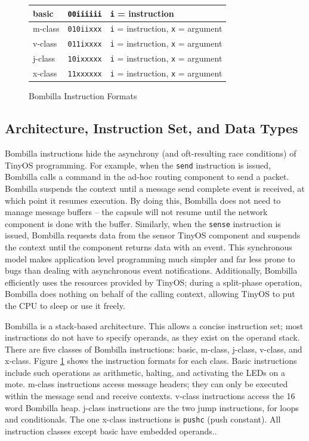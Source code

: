 \documentclass[10pt]{article}
\newcommand{\bomb}{Bombilla\xspace}
\begin{document}
\begin{figure}
\begin{center}
\def\W{3.25in}

\begin{tabular}{|l|l|l|}\hline
basic   &{\tt 00iiiiii} & {\tt i} = instruction\\ \hline
m-class &{\tt 010iixxx} & {\tt i} = instruction, {\tt x} = argument \\ \hline
v-class &{\tt 011ixxxx} & {\tt i} = instruction, {\tt x} = argument \\ \hline
j-class &{\tt 10ixxxxx} & {\tt i} = instruction, {\tt x} = argument \\ \hline
x-class &{\tt 11xxxxxx} & {\tt i} = instruction, {\tt x} = argument\\ \hline
\end{tabular}


\caption{\bomb Instruction Formats}

\label{fig:instr}
\end{center}
\end{figure}

\subsection{Architecture, Instruction Set, and Data Types}


\bomb instructions hide the asynchrony (and oft-resulting race
conditions) of TinyOS programming. For example, when the {\tt send}
instruction is issued, \bomb calls a command in the ad-hoc routing
component to send a packet. \bomb suspends the context until a
message send complete event is received, at which point it resumes
execution. By doing this, \bomb does not need to manage message
buffers -- the capsule will not resume until the network component is
done with the buffer. Similarly, when the {\tt sense} instruction is
issued, \bomb requests data from the sensor TinyOS component and
suspends the context until the component returns data with an
event. This synchronous model makes application level programming much
simpler and far less prone to bugs than dealing with asynchronous
event notifications. Additionally, \bomb efficiently uses the
resources provided by TinyOS; during a split-phase operation, \bomb
does nothing on behalf of the calling context, allowing TinyOS to put
the CPU to sleep or use it freely.


\bomb is a stack-based architecture. This allows a concise
instruction set; most instructions do not have to specify operands, as
they exist on the operand stack. There are five classes of \bomb
instructions: basic, m-class, j-class, v-class, and x-class. Figure
\ref{fig:instr} shows the instruction formats for each class. Basic
instructions include such operations as arithmetic, halting, and
activating the LEDs on a mote. m-class instructions access message
headers; they can only be executed within the message send and receive
contexts. v-class instructions access the 16 word \bomb
heap. j-class instructions are the two jump instructions, for loops
and conditionals. The one x-class instructions is {\tt pushc} (push
constant). All instruction classes except basic have embedded operands..
\end{document}
